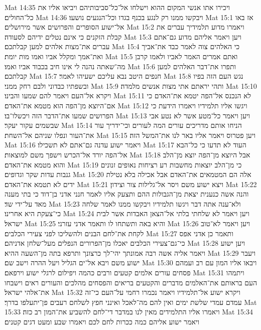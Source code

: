 Mat 14:35  ויכירו אתו אנשי המקום ההוא וישלחו אל־כל־סביבותיהם ויביאו אליו את כל־החולים׃
Mat 14:36  ויבקשו ממנו רק לנגע בכנף בגדו וכל־הנגעים נושעו׃
Mat 15:1  אז באו אל־ישוע הסופרים והפרושים אשר מירושלים׃
Mat 15:2  ויאמרו מדוע תלמידיך עברים את קבלת הזקנים כי אינם נטלים ידיהם לסעודה׃
Mat 15:3  ויען ויאמר אליהם מדוע גם־אתם עברים את־מצות אלהים למען קבלתכם׃
Mat 15:4  כי האלהים צוה לאמר כבד את־אביך ואת־אמך ומקלל אביו ואמו מות יומת׃
Mat 15:5  ואתם אמרים האמר לאביו ולאמו קרבן מה־שאתה נהנה לי אינו חיב בכבוד אביו ואמו׃
Mat 15:6  ותפרו את־דבר האלהים למען קבלתכם׃
Mat 15:7  חנפים היטב נבא עליכם ישעיהו לאמר׃
Mat 15:8  נגש העם הזה בפיו ובשפתיו כבדוני ולבם רחק ממני׃
Mat 15:9  ותהי יראתם אתי מצות אנשים מלמדה׃
Mat 15:10  ויקרא אל־העם ויאמר להם שמעו והבינו׃
Mat 15:11  לא הנכנס אל־הפה יטמא את־האדם כי אם־היוצא מן־הפה הוא מטמא את־האדם׃
Mat 15:12  ויגשו אליו תלמידיו ויאמרו הידעת כי הפרושים שמעו את־הדבר הזה ויכשלו־בו׃
Mat 15:13  ויען ויאמר כל־מטע אשר לא נטע אבי שבשמים עקור יעקר׃
Mat 15:14  הניחו אותם מדריכים עורים המה לעורים וכי־ידריך עור את־העור ונפלו שניהם אל־השחת׃
Mat 15:15  ויען פטרוס ויאמר אליו באר לנו את־המשל הזה׃
Mat 15:16  ויאמר ישוע עדנה גם־אתם לא תשכילו׃
Mat 15:17  העוד לא תדעו כי כל־הבא אל־הפה יורד אל־הכרש וישפך משם למוצאות׃
Mat 15:18  אבל היוצא מן־הפה יוצא מן־הלב והוא מטמא את־האדם׃
Mat 15:19  כי מן־הלב יוצאות מחשבות רע רציחות נאופים זנונים גנבות עדות שקר וגדופים׃
Mat 15:20  אלה הם המטמאים את־האדם אבל אכילה בלא נטילת ידים לא תטמא את־האדם׃
Mat 15:21  ויצא ישוע משם ויסר אל־גלילות צור וצידון׃
Mat 15:22  והנה אשה כנענית יצאת מן־הגבולות ההם ותצעק אליו לאמר חנני אדני בן־דוד כי בתי מענה מאד על־ידי שד׃
Mat 15:23  ולא־ענה אתה דבר ויגשו תלמידיו ויבקשו ממנו לאמר שלחה כי־צעקת היא אחרינו׃
Mat 15:24  ויען ויאמר לא שלחתי בלתי אל־הצאן האבדות אשר לבית ישראל׃
Mat 15:25  והיא באה ותשתחו לו ותאמר אדני עזרני׃
Mat 15:26  ויען ויאמר לא־טוב לקחת את־לחם הבנים ולהשליכו לפני צעירי הכלבים׃
Mat 15:27  ותאמר כן אדני אפס כי־גם־צעירי הכלבים יאכלו מן־הפרורים הנפלים מעל־שלחן אדניהם׃
Mat 15:28  ויען ישוע ויאמר אליה אשה רבה אמונתך יהי־לך כרצונך ותרפא בתה מן־השעה ההיא׃
Mat 15:29  ויעבר ישוע משם ויבא אל־ים הגליל ויעל ההרה וישב שם׃
Mat 15:30  ויבאו אליו המון עם רב ועמהם פסחים עורים אלמים קטעים ורבים כהמה ויפילום לרגלי ישוע וירפאם׃
Mat 15:31  ויתמהו העם בראותם את־האלמים מדברים והקטעים בריאים והפסחים מהלכים והעורים ראים וישבחו את־אלהי ישראל׃
Mat 15:32  ויקרא ישוע אל־תלמידיו ויאמר נכמרו רחמי על־העם כי־זה עמדם עמדי שלשת ימים ואין להם מה־לאכל ואינני חפץ לשלחם רעבים פן־יתעלפו בדרך׃
Mat 15:33  ויאמרו אליו התלמידים מאין לנו במדבר די־לחם להשביע את־המון רב כזה׃
Mat 15:34  ויאמר ישוע אליהם כמה ככרות לחם לכם ויאמרו שבע ומעט דגים קטנים׃
